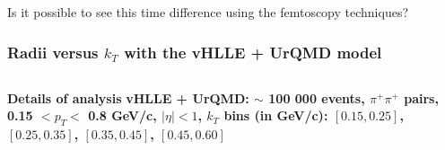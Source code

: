\documentclass[dvipsnames] {beamer}
\begin{document}
\begin{frame}[shrink=20]
\begin{block}{}
        Is it possible to see this time difference using the femtoscopy techniques?
    \end{block}
   
\end{frame}


\begin{frame}[shrink=50]
  \frametitle{Radii versus $k_{T}$ with the vHLLE + UrQMD model}
  \begin{columns}
    \begin{block}{\bf \centering Details of analysis}
     \bf \centering 
      vHLLE + UrQMD: $\sim$ 100 000 events,
      $\pi^{+}\pi^{+}$ pairs,     
      0.15 $ < p_{T} < $ 0.8 GeV/c,      
      $|\eta| < 1$,      
      $k_{T}$ bins (in GeV/c): $[0.15, 0.25]$, $[0.25, 0.35]$, $[0.35, 0.45]$, $[0.45, 0.60]$
      
    \end{block}
  \end{columns}
  

\end{frame}
\end{document}
